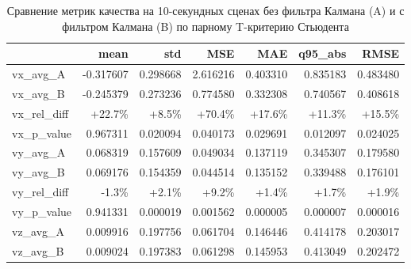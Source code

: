 \begin{table}
\centering
\caption{Сравнение метрик качества на 10-секундных сценах без фильтра Калмана (A) и с фильтром Калмана (B) по парному T-критерию Стьюдента}
\label{tab:ttest-kalman}
\small
\setlength{\tabcolsep}{4pt}
\begin{tabular}{|l|r|r|r|r|r|r|}
\hline
 & mean & std & MSE & MAE & q95\_abs & RMSE \\
\hline
vx\_avg\_A & -0.317607 & 0.298668 & 2.616216 & 0.403310 & 0.835183 & 0.483480 \\
\hline
vx\_avg\_B & -0.245379 & 0.273236 & 0.774580 & 0.332308 & 0.740567 & 0.408618 \\
\hline
vx\_rel\_diff & +22.7\% & +8.5\% & +70.4\% & +17.6\% & +11.3\% & +15.5\% \\
\hline
vx\_p\_value & {\color{red}0.967311} & {\color{green!50!black}0.020094} & {\color{green!50!black}0.040173} & {\color{green!50!black}0.029691} & {\color{green!50!black}0.012097} & {\color{green!50!black}0.024025} \\
\hline\hline
vy\_avg\_A & 0.068319 & 0.157609 & 0.049034 & 0.137119 & 0.345307 & 0.179580 \\
\hline
vy\_avg\_B & 0.069176 & 0.154359 & 0.044514 & 0.135152 & 0.339488 & 0.176101 \\
\hline
vy\_rel\_diff & -1.3\% & +2.1\% & +9.2\% & +1.4\% & +1.7\% & +1.9\% \\
\hline
vy\_p\_value & 0.941331 & {\color{green!50!black}0.000019} & {\color{green!50!black}0.001562} & {\color{green!50!black}0.000005} & {\color{green!50!black}0.000007} & {\color{green!50!black}0.000016} \\
\hline\hline
vz\_avg\_A & 0.009916 & 0.197756 & 0.061704 & 0.146446 & 0.414178 & 0.203017 \\
\hline
vz\_avg\_B & 0.009024 & 0.197383 & 0.061298 & 0.145953 & 0.413049 & 0.202472 \\
\hline

\end{tabular}
\end{table}
